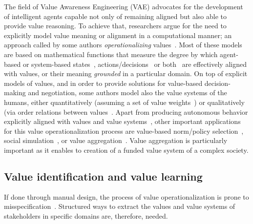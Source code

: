 \documentclass{ecai}
\begin{document}
The field of Value Awareness Engineering (VAE)\cite{values2021nardineold} advocates for the development of intelligent agents capable not only of remaining aligned but also able to provide value reasoning. To achieve that, researchers argue for the need to explicitly model value meaning or alignment in a computational manner; an approach called by some authors \textit{operationalizing} values~\cite{Shahin2022OperationalizingvaluesSurveySoftwareengineering}. Most of these models are based on mathematical functions that measure the degree by which agent-based or system-based states~\cite{montes2022synthesis}, actions/decisions~\cite{serramia2023EncodingValueAlignedNorms,Karanik2024} or both~\cite{rodriguez2023reinforcementEthicalEmbedingWeightsRewardRL,Veronese2024,andres2023vae} are effectively aligned with values, or their meaning \textit{grounded} in a particular domain. On top of explicit models of values, and in order to provide solutions for value-based decision-making and negotiation, some authors model also the value systems of the humans, either quantitatively (assuming a set of value weights~\cite{negotiationOfNormsvalues2021,Karanik2024,andres2024vecompPaper}) or qualitatively (via order relations between values~\cite{bench2012using,Serramia2020valuesystem,Beauchamp2019valuesystemasorderedvalues}. Apart from producing autonomous behavior explicitly aligned with values and value systems~\cite{rodriguez2023reinforcementEthicalEmbedingWeightsRewardRL,andres2023eumas,andres2024vecompPaper}, other important applications for this value operationalization process are value-based norm/policy selection~\cite{montes2022synthesis,Serramia2018,negotiationOfNormsvalues2021}, social simulation~\cite{montes2022synthesis,aguilera2024poverty}, or value aggregation~\cite{leraleri2024aggregation,AaronAgreementTOPSIS}. Value aggregation is particularly important as it enables to creation of a funded value system of a complex society.


\subsection{Value identification and value learning}

If done through manual design, the process of value operationalization is prone to misspecification~\cite{Sumers2022InstructionsAndDescriptions}. Structured ways to extract the values and value systems of stakeholders in specific domains are, therefore, needed. 
\end{document}
